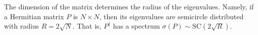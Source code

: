 \begin{remark}
The dimension of the matrix determines the radius of the eigenvalues. Namely, if a Hermitian matrix $P$ is $N \times N$, then its eigenvalues are semicircle distributed with radius $R = 2\sqrt{N}$. That is, $P^{\dagger}$ has a spectrum $\sigma({P}) \sim \text{SC}(2\sqrt{R})$.
\end{remark}


